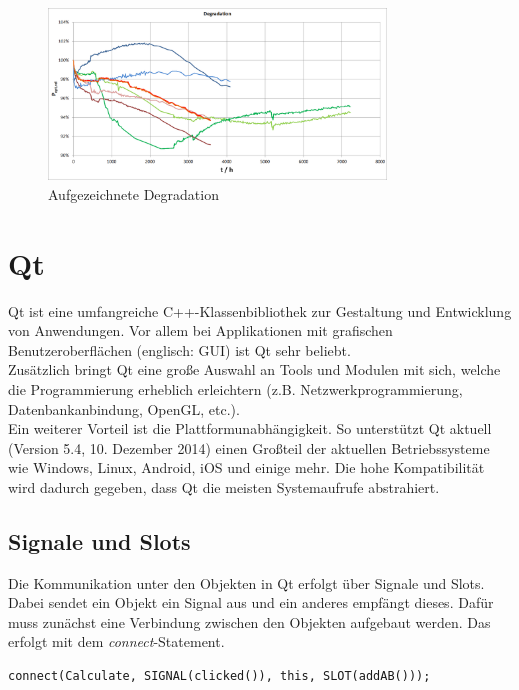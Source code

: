  
\begin{figure}[H]
\begin{center}
\includegraphics[width=0.8\textwidth]{img/general/Degradation.png}
\caption{Aufgezeichnete Degradation}
\label{figure_Degradation}
\end{center}
\end{figure}



\section{Qt}
\label{section_Qt}
Qt \cite{qtproject} ist eine umfangreiche C++-Klassenbibliothek zur Gestaltung und Entwicklung von Anwendungen. Vor allem bei Applikationen mit grafischen Benutzeroberflächen (englisch: \ac{GUI}) ist Qt sehr beliebt. \\
Zusätzlich bringt Qt eine große Auswahl an Tools und Modulen mit sich, welche die Programmierung erheblich erleichtern (z.B. Netzwerkprogrammierung, Datenbankanbindung, OpenGL, etc.). \\
Ein weiterer Vorteil ist die Plattformunabhängigkeit. So unterstützt Qt aktuell (Version 5.4, 10. Dezember 2014) einen Großteil der aktuellen Betriebssysteme wie Windows, Linux, Android, iOS und einige mehr. Die hohe Kompatibilität wird dadurch gegeben, dass Qt die meisten Systemaufrufe abstrahiert.

\subsection{Signale und Slots}
\label{QtSignaleSlots}
Die Kommunikation unter den Objekten in Qt erfolgt über Signale und Slots. Dabei sendet ein Objekt ein Signal aus und ein anderes empfängt dieses. Dafür muss zunächst eine Verbindung zwischen den Objekten aufgebaut werden. Das erfolgt mit dem \textit{connect}-Statement.\\

\begin{lstlisting}[caption={Qt \textit{connect}-Statement},label=lst_QtConnect]
connect(Calculate, SIGNAL(clicked()), this, SLOT(addAB()));
\end{lstlisting}

